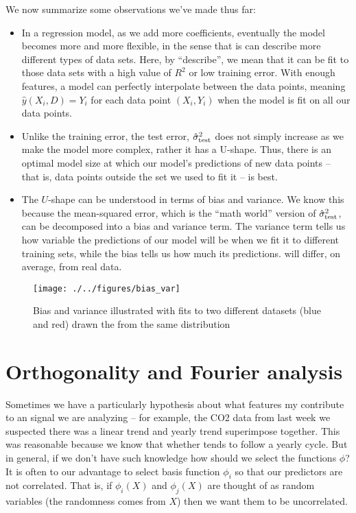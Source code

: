  We now summarize some observations we've made thus far:
\begin{itemize}
\item In a regression model, as we add more coefficients, eventually the model becomes more and more flexible, in the sense that is can describe more different types of data sets. Here, by ``describe'', we mean that it can be fit to those data sets with a high value of $R^2$ or low training error.  With enough features, a model can perfectly interpolate between the data points, meaning $\hat{y}(X_i,D) = Y_i$ for each data point $(X_i,Y_i)$ when the model is fit on all our data points. 
\item Unlike the training error, the test error, $\hat{\sigma}_{\rm test}^2$ does not simply increase as we make the model more complex, rather it has a U-shape. Thus, there is an optimal model size at which our model's predictions of new data points -- that is, data points outside the set we used to fit it -- is best. 
\item The $U$-shape can be understood in terms of bias and variance. We know this because the mean-squared error, which is the ``math world'' version of $\hat{\sigma}_{\rm test}^2$, can be decomposed into a bias and variance term. The variance term tells us how variable the predictions of our model will be when we fit it to different training sets, while the bias tells us how much its predictions. will differ, on average, from real data. 
\end{itemize}

\begin{figure}[h]
    \centering
    \texttt{[image: ./../figures/bias\_var]}
    \caption{Bias and variance illustrated with fits to two different datasets (blue and red) drawn the from the same distribution}
    \label{fig:bv}
\end{figure}







\section{Orthogonality and Fourier analysis}
 Sometimes we have a particularly hypothesis about what features my contribute to an signal we are analyzing -- for example, the CO2 data from last week we suspected there was a linear trend and yearly trend superimpose together. This was reasonable because we know that whether tends to follow a yearly cycle. But in general, if we don't have such knowledge how should we select the functions $\phi$?  It is often to our advantage to select basis function $\phi_i$ so that our predictors are not correlated. That is, if $\phi_i(X)$ and $\phi_j(X)$ are thought of as random variables (the randomness comes from $X$) then we want them to be uncorrelated. 


